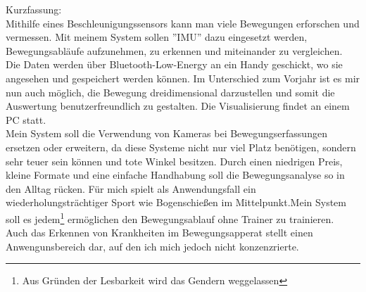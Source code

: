 Kurzfassung:\\
\small
Mithilfe eines Beschleunigungssensors kann man viele Bewegungen erforschen und vermessen. 
Mit meinem System sollen ''IMU'' dazu eingesetzt werden, Bewegungsabläufe aufzunehmen, zu erkennen und miteinander zu vergleichen.\\
Die Daten werden über Bluetooth-Low-Energy an ein Handy geschickt, wo sie angesehen und gespeichert 
werden können. Im Unterschied zum Vorjahr ist es mir nun auch möglich, die Bewegung dreidimensional 
darzustellen und somit die Auswertung benutzerfreundlich zu gestalten. Die Visualisierung findet an 
einem PC statt.\\
Mein System soll die Verwendung von Kameras bei Bewegungserfassungen ersetzen oder erweitern, da diese Systeme 
nicht nur viel Platz benötigen, sondern sehr teuer sein können und tote Winkel besitzen. 
Durch einen niedrigen Preis, kleine Formate und eine einfache Handhabung soll die Bewegungsanalyse 
so in den Alltag rücken. Für mich spielt als Anwendungsfall ein wiederholungsträchtiger Sport wie 
Bogenschießen im Mittelpunkt.Mein System soll es jedem\footnote{Aus Gründen der Lesbarkeit wird das Gendern weggelassen} 
ermöglichen den Bewegungsablauf ohne Trainer zu trainieren.\\
Auch das Erkennen von Krankheiten im Bewegungsapperat  stellt einen Anwengunsbereich dar, auf den ich mich jedoch nicht konzenzrierte.